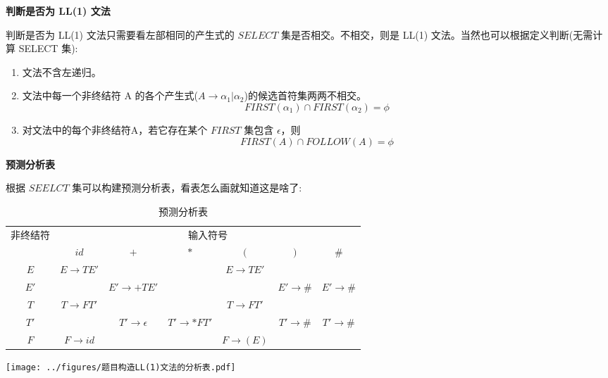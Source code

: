 \noindent\textbf{判断是否为 LL(1) 文法}

判断是否为 LL(1) 文法只需要看左部相同的产生式的 $SELECT$ 集是否相交。不相交，则是 LL(1) 文法。当然也可以根据定义判断(无需计算 SELECT 集):
\textcolor{imp}{
    \begin{enumerate}
        \item 文法不含左递归。
        \item 文法中每一个非终结符 A 的各个产生式($A\rightarrow \alpha_1 | \alpha_2$)的候选首符集两两不相交。
              \[FIRST(\alpha_1) \cap FIRST(\alpha_2) = \phi \]
        \item 对文法中的每个非终结符A，若它存在某个 $FIRST$ 集包含 $\epsilon$，则
              \[ FIRST(A) \cap FOLLOW(A) = \phi \]
    \end{enumerate}}

\noindent\textbf{预测分析表}

根据 $SEELCT$ 集可以构建预测分析表，看表怎么画就知道这是啥了:

\begin{table}[H]
    \centering
    \caption{预测分析表}
    \label{table:预测分析表}
    \setlength{\tabcolsep}{3mm}
    \begin{tabular}{c|c|c|c|c|c|c}
        \toprule
        \multirow{2}{*}{非终结符} & \multicolumn{6}{c}{输入符号}                                                                                                                       \\ \cline{2-7}
                                  & $id$                         & $+$                       & $*$                   & $($                 & $)$                 & \#                  \\
        \midrule
        $E$                       & $E \rightarrow TE'$          &                           &                       & $E\rightarrow TE'$  &                     &                     \\
        $E'$                      &                              & $E' \rightarrow +TE'$     &                       &                     & $E' \rightarrow \#$ & $E' \rightarrow \#$ \\
        $T$                       & $T\rightarrow FT'$           &                           &                       & $T\rightarrow FT'$  &                     &                     \\
        $T'$                      &                              & $T' \rightarrow \epsilon$ & $T' \rightarrow *FT'$ &                     & $T' \rightarrow \#$ & $T' \rightarrow \#$ \\
        $F$                       & $F \rightarrow id$           &                           &                       & $F \rightarrow (E)$ &                     &                     \\
        \bottomrule
    \end{tabular}
\end{table}

\texttt{[image: ../figures/题目构造LL(1)文法的分析表.pdf]}

\newpage